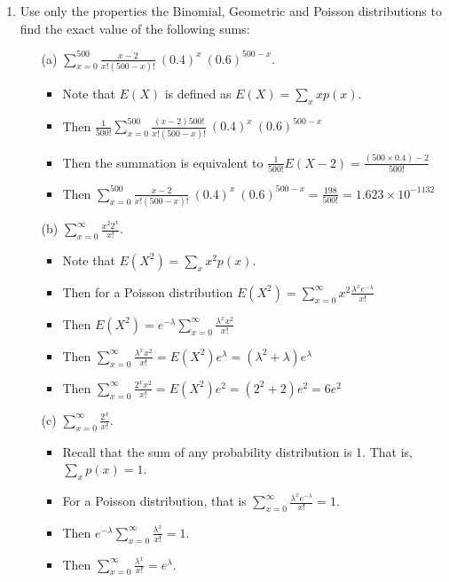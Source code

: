 \documentclass{article}
\begin{document}
\begin{enumerate}
\item Use only the properties the Binomial, Geometric and Poisson distributions to find the exact value of the following sums:
    \begin{enumerate}
    \item [(a)] $\sum_{x=0}^{500} \frac{x-2}{x!(500-x)!}~(0.4)^x~(0.6)^{500-x}$.
        \begin{itemize}
        \item Note that $E(X)$ is defined as $E(X) = \sum_{x} x p(x)$.
        \item Then $\frac{1}{500!} \sum_{x=0}^{500} \frac{(x-2)500!}{x!(500-x)!}~(0.4)^x~(0.6)^{500-x}$
        \item Then the summation is equivalent to $\frac{1}{500!} E(X - 2) = \frac{(500 \times 0.4) - 2}{500!}$
        \item Then $\sum_{x=0}^{500} \frac{x-2}{x!(500-x)!}~(0.4)^x~(0.6)^{500-x} = \frac{198}{500!} = 1.623 \times 10^{-1132}$
        \end{itemize}
    \item [(b)] $\sum_{x=0}^{\infty}\frac{x^2 2^x}{x!}$.
        \begin{itemize}
        \item Note that $E(X^2) = \sum_{x} x^2 p(x)$.
        \item Then for a Poisson distribution $E(X^2) = \sum_{x=0}^{\infty} x^2 \frac{\lambda^x e^{-\lambda}}{x!}$
        \item Then $E(X^2) = e^{-\lambda} \sum_{x=0}^{\infty} \frac{\lambda^x x^2}{x!}$
        \item Then $\sum_{x=0}^{\infty} \frac{\lambda^x x^2}{x!} = E(X^2)e^\lambda = (\lambda^2 + \lambda)e^\lambda$
        \item Then $\sum_{x=0}^{\infty} \frac{2^x x^2}{x!} = E(X^2)e^2 = (2^2 + 2)e^2 = 6 e^2$
        \end{itemize}
    \item [(c)] $\sum_{x=0}^{\infty}\frac{2^x}{x!}$.
        \begin{itemize}
        \item Recall that the sum of any probability distribution is 1. That is, $\sum_{x} p(x) = 1$.
        \item For a Poisson distribution, that is $\sum_{x=0}^{\infty} \frac{\lambda^x e^{-\lambda}}{x!} = 1$.
        \item Then $e^{-\lambda} \sum_{x=0}^{\infty} \frac{\lambda^x}{x!} = 1$.
        \item Then $\sum_{x=0}^{\infty} \frac{\lambda^x}{x!} = e^{\lambda}$.

\end{itemize}
\end{enumerate}
\end{enumerate}
\end{document}
